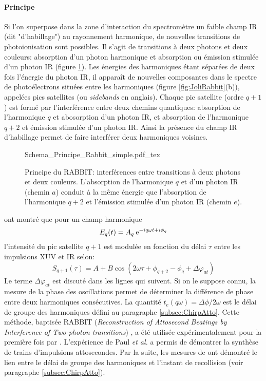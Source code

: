 \paragraph{Principe} Si l'on superpose dans la zone d'interaction du spectromètre un faible champ IR (dit "d'habillage") au rayonnement harmonique, de nouvelles transitions de photoionisation sont possibles. Il s'agit de transitions à deux photons et deux couleurs: absorption d'un photon harmonique et absorption ou émission stimulée d'un photon IR (figure \ref{fig:PrincipeRabbit2}). Les énergies des harmoniques étant séparées de deux fois l'énergie du photon IR, il apparaît de nouvelles composantes dans le spectre de photoélectrons situées entre les harmoniques (figure \ref{fig:JoliRabbit}(b)), appelées pics satellites (ou \textit{sidebands} en anglais). Chaque pic satellite (ordre $q+1$) est formé par l'interférence entre deux chemins quantiques: absorption de l'harmonique $q$ et abosorption d'un photon IR, et absorption de l'harmonique $q+2$ et émission stimulée d'un photon IR. Ainsi la présence du champ IR d'habillage permet de faire interférer deux harmoniques voisines.

\begin{figure}[ht]
\centering
\def\svgwidth{0.5\columnwidth}
{Schema_Principe_Rabbit_simple.pdf_tex}
\caption{Principe du RABBIT: interférences entre transitions à deux photons et deux couleurs. L'absorption de l'harmonique $q$ et d'un photon IR (chemin $a$) conduit à la même énergie que l'absorption de l'harmonique $q+2$ et l'émission stimulée d'un photon IR (chemin $e$).}
\label{fig:PrincipeRabbit2}
\end{figure}

  ont montré que  pour un champ harmonique
\begin{equation}
E_q(t) = A_q \: \mathrm{e}^{-iq\omega t + i\phi_q}
\end{equation}
l'intensité du pic satellite $q+1$ est modulée en fonction du délai $\tau$ entre les impulsions XUV et IR selon:
\begin{equation}
S_{q+1}(\tau) = A + B \cos(2\omega \tau + \phi_{q+2} - \phi_q + \Delta \varphi_{at})
\label{eq:Rabbit_simple}
\end{equation}
Le terme $\Delta \varphi_{at}$ est discuté dans les lignes qui suivent. Si on le suppose connu, la mesure de la phase des oscillations permet de déterminer la différence de phase entre deux harmoniques consécutives. La quantité $t_e (q\omega) = \Delta \phi / 2\omega$ est le délai de groupe des harmoniques défini au paragraphe \ref{subsec:ChirpAtto}. Cette méthode, baptisée RABBIT (\textit{Reconstruction of Attosecond Beatings by Interference of Two-photon transitions}) , a été utilisée expérimentalement pour la première fois par . L'expérience de Paul \textit{et al.} a permis de démontrer la synthèse de trains d'impulsions attosecondes. Par la suite, les mesures de  ont démontré le lien entre le délai de groupe des harmoniques et l'instant de recollision (voir paragraphe \ref{subsec:ChirpAtto}). 

